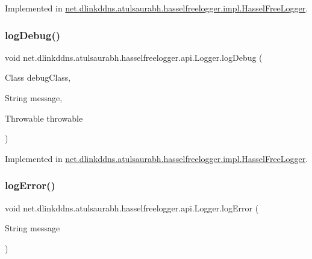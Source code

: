 Implemented in \mbox{\hyperlink{classnet_1_1dlinkddns_1_1atulsaurabh_1_1hasselfreelogger_1_1impl_1_1_hassel_free_logger_a7c65f65791b715d7c72a2227a8a00bdc}{net.\+dlinkddns.\+atulsaurabh.\+hasselfreelogger.\+impl.\+Hassel\+Free\+Logger}}.

\mbox{\label{interfacenet_1_1dlinkddns_1_1atulsaurabh_1_1hasselfreelogger_1_1api_1_1_logger_aff388bb623493721b9aac70ef39492ec}} 
\subsubsection{\texorpdfstring{log\+Debug()}{logDebug()}\hspace{0.1cm}{\footnotesize\ttfamily [3/3]}}
{\footnotesize\ttfamily void net.\+dlinkddns.\+atulsaurabh.\+hasselfreelogger.\+api.\+Logger.\+log\+Debug (\begin{DoxyParamCaption}\item[{Class}]{debug\+Class,  }\item[{String}]{message,  }\item[{Throwable}]{throwable }\end{DoxyParamCaption})}



Implemented in \mbox{\hyperlink{classnet_1_1dlinkddns_1_1atulsaurabh_1_1hasselfreelogger_1_1impl_1_1_hassel_free_logger_a0995d59f7b5262af4be98f4e7ba21cd0}{net.\+dlinkddns.\+atulsaurabh.\+hasselfreelogger.\+impl.\+Hassel\+Free\+Logger}}.

\mbox{\label{interfacenet_1_1dlinkddns_1_1atulsaurabh_1_1hasselfreelogger_1_1api_1_1_logger_ae6a2cef332dfb10951c4cbfd822bbb63}} 
\subsubsection{\texorpdfstring{log\+Error()}{logError()}\hspace{0.1cm}{\footnotesize\ttfamily [1/3]}}
{\footnotesize\ttfamily void net.\+dlinkddns.\+atulsaurabh.\+hasselfreelogger.\+api.\+Logger.\+log\+Error (\begin{DoxyParamCaption}\item[{String}]{message }\end{DoxyParamCaption})}



